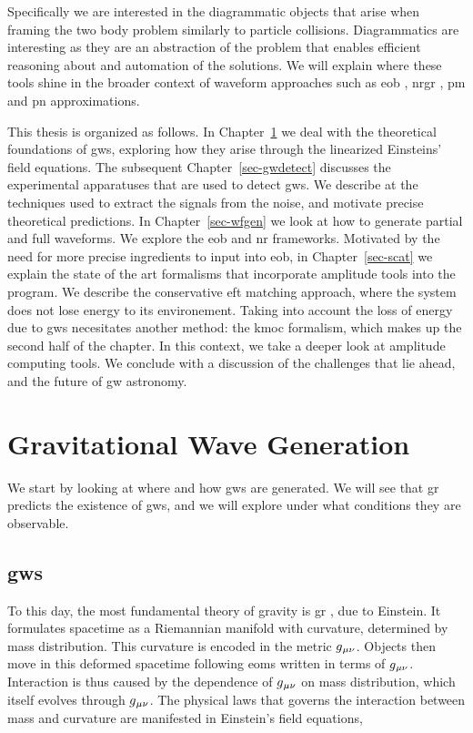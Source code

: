 \documentclass[
  11pt,
  a4paper,
  DIV=11,
  numbers=noendperiod,
  twoside]{scrreprt}
\DeclareRobustCommand{\[}{\begin{equation}}
\DeclareRobustCommand{\]}{\end{equation}}
\begin{document}
Specifically we are interested in the diagrammatic objects that arise
when framing the two body problem similarly to particle collisions.
Diagrammatics are interesting as they are an abstraction of the problem
that enables efficient reasoning about and automation of the solutions.
We will explain where these tools shine in the broader context of
waveform approaches such as \gls{eob} , \gls{nrgr} , \gls{pm} and
\gls{pn} approximations.

This thesis is organized as follows. In Chapter~\ref{sec-gwgen} we deal
with the theoretical foundations of \glspl{gw}, exploring how they arise
through the linearized Einsteins' field equations. The subsequent
Chapter~\ref{sec-gwdetect} discusses the experimental apparatuses that
are used to detect \glspl{gw}. We describe at the techniques used to
extract the signals from the noise, and motivate precise theoretical
predictions. In Chapter~\ref{sec-wfgen} we look at how to generate
partial and full waveforms. We explore the \gls{eob} and \gls{nr}
frameworks. Motivated by the need for more precise ingredients to input
into \gls{eob}, in Chapter~\ref{sec-scat} we explain the state of the
art formalisms that incorporate amplitude tools into the program. We
describe the conservative \gls{eft} matching approach, where the system
does not lose energy to its environement. Taking into account the loss
of energy due to \glspl{gw} necesitates another method: the \gls{kmoc}
formalism, which makes up the second half of the chapter. In this
context, we take a deeper look at amplitude computing tools. We conclude
with a discussion of the challenges that lie ahead, and the future of
\gls{gw} astronomy.


\hypertarget{sec-gwgen}{%
\chapter{Gravitational Wave Generation}\label{sec-gwgen}}

We start by looking at where and how \glspl{gw} are generated. We will
see that \gls{gr} predicts the existence of \glspl{gw}, and we will
explore under what conditions they are observable.

\hypertarget{sgw}{%
\section{\texorpdfstring{\glspl{gw}}{}}\label{sgw}}

To this day, the most fundamental theory of gravity is \gls{gr} , due to
Einstein. It formulates spacetime as a Riemannian manifold with
curvature, determined by mass distribution. This curvature is encoded in
the metric \(g{}_{\mu\nu}\). Objects then move in this deformed spacetime
following \glspl{eom} written in terms of \(g{}_{\mu\nu}\). Interaction is thus
caused by the dependence of \(g{}_{\mu\nu}\) on mass distribution, which itself
evolves through \(g{}_{\mu\nu}\). The physical laws that governs the interaction
between mass and curvature are manifested in Einstein's field equations,
\end{document}
